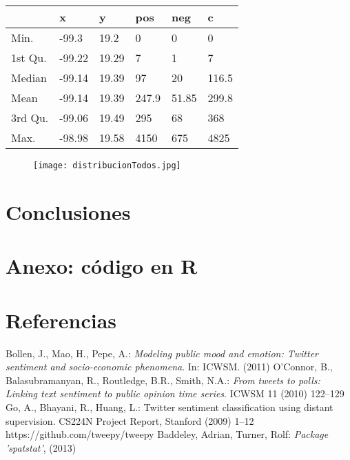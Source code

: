 \documentclass{article}
\begin{document}
\newpage

\begin{center}
\begin{tabular}{| l | l | l | l| l| l| }
\hline
	&	x	&	y	&	pos	&	neg	&	c	\\	\hline	
Min.	&	-99.3	&	19.2	&	0	&	0	&	0	\\	\hline	
1st Qu.	&	-99.22	&	19.29	&	7	&	1	&	7	\\	\hline	
Median	&	-99.14	&	19.39	&	97	&	20	&	116.5	\\	\hline	
Mean	&	-99.14	&	19.39	&	247.9	&	51.85	&	299.8	\\	\hline	
3rd Qu.	&	-99.06	&	19.49	&	295	&	68	&	368	\\	\hline	
Max.	&	-98.98	&	19.58	&	4150	&	675	&	4825	\\	\hline	
\end{tabular}
\end{center}

\begin{figure}[h!]
\centering
\texttt{[image: distribucionTodos.jpg]}
\end{figure}


\newpage

\section{Conclusiones}



\newpage

\section{Anexo: código en R}

\newpage

\section{Referencias}

    \begin{thebibliography}{9}
    Bollen, J., Mao, H., Pepe, A.: \emph{Modeling public mood and emotion: Twitter sentiment and socio-economic phenomena}. In: ICWSM. (2011)
    O’Connor, B., Balasubramanyan, R., Routledge, B.R., Smith, N.A.: \emph{From tweets to polls: Linking text sentiment to public opinion time series}. ICWSM 11 (2010) 122–129
    Go, A., Bhayani, R., Huang, L.: Twitter sentiment classification using distant supervision. CS224N Project Report, Stanford (2009) 1–12
        https://github.com/tweepy/tweepy
   Baddeley, Adrian, Turner, Rolf: \emph{Package 'spatstat'}, (2013)
    \end{thebibliography}
\end{document}
